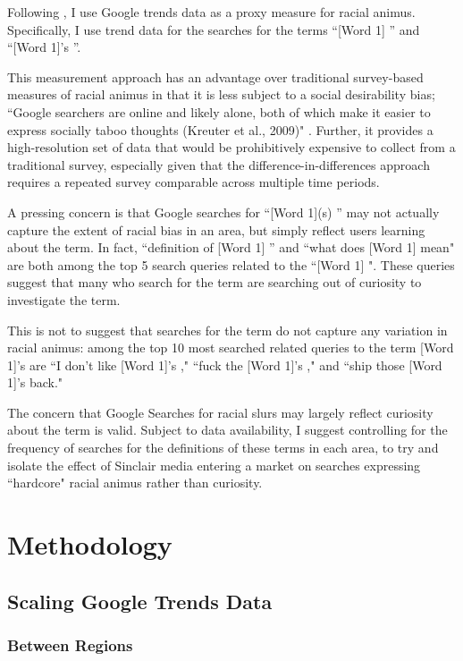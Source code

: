 \documentclass{article}
\newcommand{\wone}{[Word 1] }
\newcommand{\wones}{[Word 1]'s }
\newcommand{\woneps}{[Word 1](s) }
\begin{document}
Following \cite{Stephens_Davidowitz_2014}, I use Google trends data as a proxy measure for racial animus.
Specifically, I use trend data for the searches for the terms ``\wone'' and ``\wones''.

This measurement approach has an advantage over traditional survey-based measures of racial animus in that it is less subject to a social desirability bias;
``Google searchers are online and likely alone, both of which make it easier to express socially taboo thoughts (Kreuter et al., 2009)" \parencite[][26]{Stephens_Davidowitz_2014}.
Further, it provides a high-resolution set of data that would be prohibitively expensive to collect from a traditional survey, especially given that the difference-in-differences approach requires a repeated survey comparable across multiple time periods.

A pressing concern is that Google searches for ``\woneps'' may not actually capture the extent of racial bias in an area, but simply reflect users learning about the term.
In fact, ``definition of \wone'' and ``what does \wone mean" are both among the top 5 search queries related to the ``\wone".
These queries suggest that many who search for the term are searching out of curiosity to investigate the term.

This is not to suggest that searches for the term do not capture any variation in racial animus: among the top 10 most searched related queries to the term \wones are ``I don't like \wones,"  ``fuck the \wones," and ``ship those \wones back."

The concern that Google Searches for racial slurs may largely reflect curiosity about the term is valid.
Subject to data availability, I suggest controlling for the frequency of searches for the definitions of these terms in each area, to try and isolate the effect of Sinclair media entering a market on searches expressing ``hardcore" racial animus rather than curiosity.


\section{Methodology}
\subsection{Scaling Google Trends Data}
\subsubsection{Between Regions}
\end{document}
